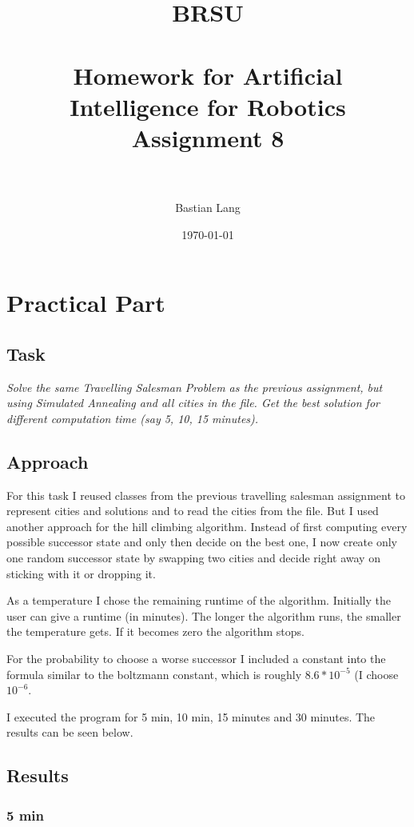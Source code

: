 \documentclass[paper=a4, fontsize=11pt]{scrartcl} %
\title{	
\normalfont \normalsize 
\textsc{BRSU} \\ [25pt] %
\horrule{0.5pt} \\[0.4cm] %
\huge Homework for Artificial Intelligence for Robotics\\Assignment 8 \\ %
\horrule{2pt} \\[0.5cm] %
}
\author{Bastian Lang} %
\date{\normalsize\today} %
\numberwithin{equation}{section} %
\numberwithin{figure}{section} %
\numberwithin{table}{section} %
\begin{document}
\maketitle %

\section{Practical Part}

\subsection{Task}
\textit{Solve the same Travelling Salesman Problem as the previous assignment, but using Simulated Annealing and all cities in the file. Get the best solution for different computation
time (say 5, 10, 15 minutes).}

\subsection{Approach}
For this task I reused classes from the previous travelling salesman assignment to represent cities and solutions and to read the cities from the file. But I used another approach for the hill climbing algorithm. Instead of first computing every possible successor state and only then decide on the best one, I now create only one random successor state by swapping two cities and decide right away on sticking with it or dropping it.

As a temperature I chose the remaining runtime of the algorithm. Initially the user can give a runtime (in minutes). The longer the algorithm runs, the smaller the temperature gets. If it becomes zero the algorithm stops. 

For the probability to choose a worse successor I included a constant into the formula similar to the boltzmann constant, which is roughly $8.6 * 10^{-5}$ (I choose $10^{-6}$. 

I executed the program for 5 min, 10 min, 15 minutes and 30 minutes. The results can be seen below.

\subsection{Results}

\subsubsection{5 min}
\end{document}
